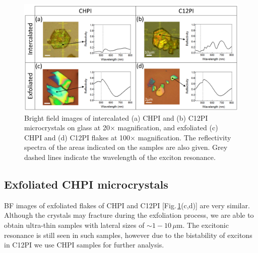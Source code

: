 \begin{figure}[ht] 
\centering    
\includegraphics[width=\textwidth]{Fig2}
\caption[Intercalated and exfoliated perovskite microcrystals.]{Bright field images of intercalated (a) CHPI and (b) C12PI microcrystals on glass at 20$\times$ magnification, and exfoliated (c) CHPI and (d) C12PI flakes at 100$\times$ magnification. The reflectivity spectra of the areas indicated on the samples are also given. Grey dashed lines indicate the wavelength of the exciton resonance.}
\label{5Fig2}
\end{figure}
\subsection{Exfoliated CHPI microcrystals}

BF images of exfoliated flakes of CHPI and C12PI [Fig.\,\ref{5Fig2}(c,d)] are very similar. Although the crystals may fracture during the exfoliation process, we are able to obtain ultra-thin samples with lateral sizes of $\sim1-10\,\mu$m. The excitonic resonance is still seen in such samples, however due to the bistability of excitons in C12PI we use CHPI samples for further analysis.

